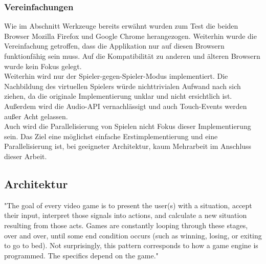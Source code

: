\subsubsection{Vereinfachungen}
\label{subsubsec:Vereinfachungen}
Wie im Abschnitt Werkzeuge bereits erwähnt wurden zum Test die beiden Browser Mozilla Firefox und Google Chrome herangezogen. Weiterhin wurde die Vereinfachung getroffen, dass die Applikation nur auf diesen Browsern funktionfähig sein muss. Auf die Kompatibilität zu anderen und älteren Browsern wurde kein Fokus gelegt.\\
Weiterhin wird nur der Spieler-gegen-Spieler-Modus implementiert. Die Nachbildung des virtuellen Spielers würde nichttrivialen Aufwand nach sich ziehen, da die originale Implementierung unklar und nicht ersichtlich ist.\\
Außerdem wird die Audio-API vernachlässigt und auch Touch-Events werden außer Acht gelassen.\\
Auch wird die Parallelisierung von Spielen nicht Fokus dieser Implementierung sein. Das Ziel eine möglichst einfache Erstimplementierung und eine Parallelisierung ist, bei geeigneter Architektur, kaum Mehrarbeit im Anschluss dieser Arbeit.

\subsection{Architektur}
\label{subsec:Architektur}
"The goal of every video game is to present the user(s) with a situation, accept their input, interpret those signals into actions, and calculate a new situation resulting from those acts. Games are constantly looping through these stages, over and over, until some end condition occurs (such as winning, losing, or exiting to go to bed). Not surprisingly, this pattern corresponds to how a game engine is programmed. The specifics depend on the game." \cite{https://developer.mozilla.org/en-us/docs/games/anatomy}

